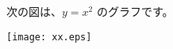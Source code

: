 \documentclass{jarticle}
\begin{document}
次の図は、$y=x^2$ のグラフです。

\texttt{[image: xx.eps]}                  %
\end{document}
